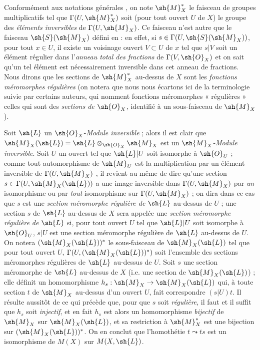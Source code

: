 \begin{env}[20.1.8]
Conformément aux notations générales , on note $\sh{M}_X^*$ le faisceau de groupes multiplicatifs tel que $\Gamma(U,\sh{M}_X^*)$ soit (pour tout ouvert $U$ de $X$) le groupe des \emph{éléments inversibles} de $\Gamma(U,\sh{M}_X)$.
Ce faisceau n'est autre que le faisceau $\sh{S}(\sh{M}_X)$ défini en  : en effet, si $s\in\Gamma(U,\sh{S}(\sh{M}_X))$, pour tout $x\in U$, il existe un voisinage ouvert $V\subset U$ de $x$ tel que $s|V$ soit un élément régulier dans l'\emph{anneau total des fractions} de $\Gamma(V,\sh{O}_X)$ et on sait qu'un tel élément est nécessairement inversible dans cet anneau de fractions.
Nous dirons que les sections de $\sh{M}_X^*$ au-dessus de $X$ sont les \emph{fonctions méromorphes régulières} (on notera que nous nous écartons ici de la terminologie suivie par certains auteurs, qui nomment fonctions méromorphes « régulières » celles qui sont des \emph{sections de $\sh{O}_X$}, identifié à un sous-faisceau de $\sh{M}_X$).

Soit $\sh{L}$ un $\sh{O}_X$-\emph{Module inversible}  ; alors il est clair que $\sh{M}_X(\sh{L})=\sh{L}\otimes_{\sh{O}_X}\sh{M}_X$
est un $\sh{M}_X$-\emph{Module inversible}.
Soit $U$ un ouvert tel que $\sh{L}|U$ soit isomorphe à $\sh{O}_U$ ; comme tout automorphisme de $\sh{M}_U$ est la multiplication par un élément inversible de $\Gamma(U,\sh{M}_X)$ , il revient au même de dire qu'une section $s\in\Gamma(U,\sh{M}_X(\sh{L}))$ a une image inversible dans $\Gamma(U,\sh{M}_X)$ par \emph{un} isomorphisme ou par \emph{tout} isomorphisme sur $\Gamma(U,\sh{M}_X)$ ; on dira dans ce cas que $s$ est une \emph{section méromorphe régulière de $\sh{L}$} au-dessus de $U$ ; une section $s$ de $\sh{L}$ au-dessus de $X$ sera appelée une \emph{section méromorphe régulière de $\sh{L}$} si, pour tout ouvert $U$ tel que $\sh{L}|U$ soit isomorphe à $\sh{O}_U$, $s|U$ est une section méromorphe régulière de $\sh{L}$ au-dessus de $U$.
On notera $(\sh{M}_X(\sh{L}))^*$ le sous-faisceau de $\sh{M}_X(\sh{L})$ tel que pour tout ouvert $U$, $\Gamma(U,(\sh{M}_X(\sh{L}))^*)$ soit l'ensemble des sections méromorphes régulières de $\sh{L}$ au-dessus de $U$.
Soit $s$ une section méromorphe de $\sh{L}$ au-dessus de $X$ (i.e. une section de $\sh{M}_X(\sh{L})$) ; elle définit un homomorphisme $h_s:\sh{M}_X\to\sh{M}_X(\sh{L})$ qui, à toute section $t$ de $\sh{M}_X$ au-dessus d'un ouvert $U$, fait correspondre $(s|U)t$.
Il résulte aussitôt de ce qui précède que, pour que $s$ soit \emph{régulière}, il faut et il suffit que $h_s$ soit \emph{injectif}, et en fait $h_s$ est alors un homomorphisme \emph{bijectif} de $\sh{M}_X$ sur $\sh{M}_X(\sh{L})$, et sa restriction à $\sh{M}_X^*$ est une bijection sur $(\sh{M}_X(\sh{L}))^*$.
On en conclut que l'homothétie $t\leadsto ts$ est un isomorphisme de $M(X)$ sur $M(X,\sh{L})$.
\end{env}

